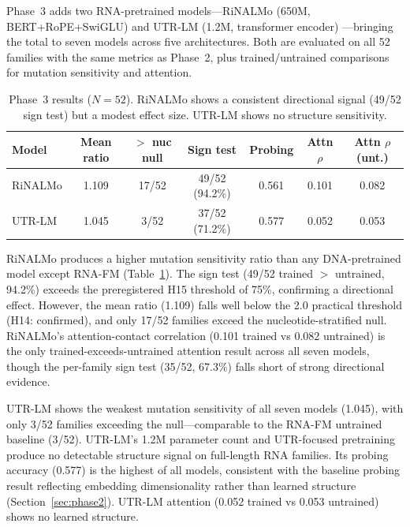 \documentclass[11pt]{article}
\begin{document}
Phase~3 adds two RNA-pretrained models---RiNALMo (650M,
BERT+RoPE+SwiGLU) \citep{penic2024rinalmo} and UTR-LM (1.2M,
transformer encoder) \citep{chu2024utrlm}---bringing the total to
seven models across five architectures.  Both are evaluated on all 52
families with the same metrics as Phase~2, plus trained/untrained
comparisons for mutation sensitivity and attention.

\begin{table}[t]
\centering
\caption{Phase~3 results ($N = 52$).  RiNALMo shows a consistent
  directional signal (49/52 sign test) but a modest effect size.
  UTR-LM shows no structure sensitivity.}
\label{tab:phase3}
\begin{tabular}{@{}lcccccc@{}}
\toprule
\textbf{Model} & \textbf{Mean ratio} & \textbf{$>$ nuc null} &
  \textbf{Sign test} & \textbf{Probing} &
  \textbf{Attn $\rho$} & \textbf{Attn $\rho$ (unt.)} \\
\midrule
RiNALMo & 1.109 & 17/52 & 49/52 (94.2\%) & 0.561 & 0.101 & 0.082 \\
UTR-LM  & 1.045 & 3/52  & 37/52 (71.2\%) & 0.577 & 0.052 & 0.053 \\
\bottomrule
\end{tabular}
\end{table}

RiNALMo produces a higher mutation sensitivity ratio than any
DNA-pretrained model except RNA-FM (Table~\ref{tab:phase3}).  The
sign test (49/52 trained $>$ untrained, 94.2\%) exceeds the
preregistered H15 threshold of 75\%, confirming a directional effect.
However, the mean ratio (1.109) falls well below the 2.0 practical
threshold (H14: confirmed), and only 17/52 families exceed the
nucleotide-stratified null.  RiNALMo's attention-contact correlation
(0.101 trained vs 0.082 untrained) is the only trained-exceeds-untrained
attention result across all seven models, though the per-family sign
test (35/52, 67.3\%) falls short of strong directional evidence.

UTR-LM shows the weakest mutation sensitivity of all seven models
(1.045), with only 3/52 families exceeding the null---comparable to
the RNA-FM untrained baseline (3/52).  UTR-LM's 1.2M parameter count
and UTR-focused pretraining produce no detectable structure signal on
full-length RNA families.  Its probing accuracy (0.577) is the highest
of all models, consistent with the baseline probing result reflecting
embedding dimensionality rather than learned structure
(Section~\ref{sec:phase2}).  UTR-LM attention (0.052 trained vs 0.053
untrained) shows no learned structure.
\end{document}
